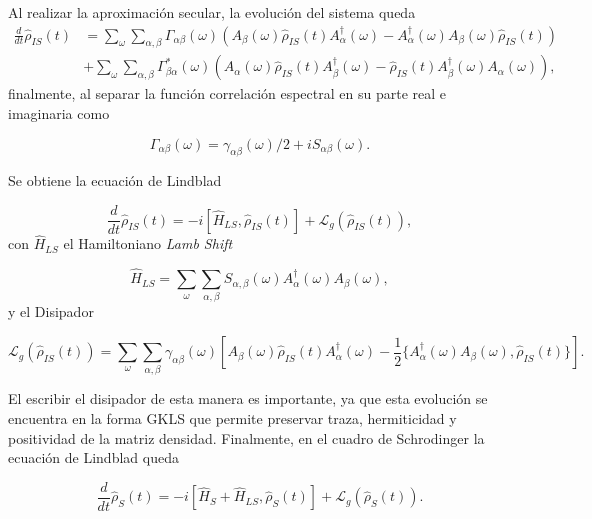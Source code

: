 Al realizar la aproximación secular, la evolución del sistema queda
\begin{align*}
    \frac{d}{dt}\hat{\rho}_{IS}(t) & = \sum_{\omega}\sum_{\alpha,\beta} \Gamma_{\alpha \beta}(\omega)\left(A_{\beta}(\omega)\hat{\rho}_{IS}(t)A^{\dagger}_{\alpha}(\omega) - A^{\dagger}_{\alpha}(\omega)A_{\beta}(\omega) \hat{\rho}_{IS}(t) \right) \\
    & + \sum_{\omega}\sum_{\alpha,\beta} \Gamma^{*}_{\beta \alpha}(\omega) \left(A_{\alpha}(\omega)\hat{\rho}_{IS}(t)A^{\dagger}_{\beta}(\omega) - \hat{\rho}_{IS}(t)A^{\dagger}_{\beta}(\omega)A_{\alpha}(\omega) \right),
\end{align*}
finalmente, al separar la función correlación espectral en su parte real e imaginaria como

\begin{equation*}
\Gamma_{\alpha \beta}(\omega) = \gamma_{\alpha \beta}(\omega)/2 + iS_{\alpha \beta}(\omega).
\end{equation*}

Se obtiene la ecuación de Lindblad 

\begin{equation}
    \frac{d}{dt} \hat{\rho}_{IS}(t) = -i[\hat{H}_{LS},\hat{\rho}_{IS}(t)] + \mathcal{L}_{g}(\hat{\rho}_{IS}(t)),
    \label{seclindbladfinal}
\end{equation}
con $\hat{H}_{LS}$ el Hamiltoniano \textit{Lamb Shift}

\begin{equation*}
    \hat{H}_{LS} = \sum_{\omega} \sum_{\alpha,\beta} S_{\alpha,\beta}(\omega)A^{\dagger}_{\alpha}(\omega)A_{\beta}(\omega), 
\end{equation*}
y el Disipador

\begin{equation*}
    \mathcal{L}_{g}(\hat{\rho}_{IS}(t)) = \sum_{\omega}\sum_{\alpha,\beta} \gamma_{\alpha \beta}(\omega) \left[ A_{\beta}(\omega)\hat{\rho}_{IS}(t)A^{\dagger}_{\alpha}(\omega) - \frac{1}{2}\{A^{\dagger}_{\alpha}(\omega)A_{\beta}(\omega), \hat{\rho}_{IS}(t)  \} \right].
\end{equation*}

El escribir el disipador de esta manera es importante, ya que esta evolución se encuentra en la forma GKLS que permite preservar traza, hermiticidad y positividad de la matriz densidad\cite{manzano2020short}. Finalmente, en el cuadro de Schrodinger la ecuación de Lindblad queda

\begin{equation}
    \frac{d}{dt} \hat{\rho}_{S}(t) = -i[\hat{H}_{S}+\hat{H}_{LS},\hat{\rho}_{S}(t)] + \mathcal{L}_{g}(\hat{\rho}_{S}(t)).
    \label{eqsec2:lindbladS}
\end{equation}

